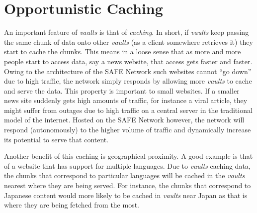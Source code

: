 \section{Opportunistic Caching}

 An important feature of \textit{vaults} is that of \textit{caching}. In short, if \textit{vaults} keep passing the same chunk of data onto other \textit{vaults} (as a client somewhere retrieves it) they start to cache the chunks. This means in a loose sense that as more and more people start to access data, say a news website, that access gets faster and faster. Owing to the architecture of the SAFE Network such websites cannot ``go down'' due to high traffic, the network simply responds by allowing more \textit{vaults} to cache and serve the data. This property is important to small websites. If a smaller news site suddenly gets high amounts of traffic, for instance a viral article, they might suffer from outages due to high traffic on a central server in the traditional model of the internet. Hosted on the SAFE Network however, the network will respond (autonomously) to the higher volume of traffic and dynamically increase its potential to serve that content.
 
 Another benefit of this caching is geographical proximity. A good example is that of a website that has support for multiple languages. Due to \textit{vaults} caching data, the chunks that correspond to particular languages will be cached in the \textit{vaults} nearest where they are being served. For instance, the chunks that correspond to Japanese content would more likely to be cached in \textit{vaults} near Japan as that is where they are being fetched from the most.
 